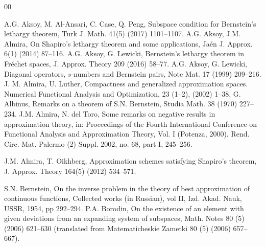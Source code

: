 \documentclass[12pt, reqno]{amsart}
\theoremstyle{definition}
\theoremstyle{remark}
\numberwithin{equation}{section}
\begin{document}
%
\begin{thebibliography}{00}

 A.G. Aksoy, M. Al-Ansari, C. Case, Q. Peng, Subspace condition for Bernstein's lethargy theorem, Turk J. Math. 41(5) (2017) 1101--1107.
 A.G. Aksoy,  J.M. Almira, On Shapiro's lethargy theorem and some applications, Ja\'{e}n J. Approx. 6(1) (2014) 87--116.
      A.G. Aksoy, G. Lewicki, Bernstein's lethargy theorem in Fr\'{e}chet spaces,  J. Approx. Theory 209 (2016) 58--77.
         A.G. Aksoy, G. Lewicki,  Diagonal operators, $s$-numbers and Bernstein pairs,  Note Mat. 17 (1999) 209--216.
         {J. M. Almira, U. Luther, } Compactness and generalized approximation spaces. Numerical Functional Analysis and Optimization, 23 (1--2), (2002) 1--38. 
 G. Albinus, Remarks on a theorem of S.N. Bernstein, Studia Math. 38 (1970) 227--234.
 J.M. Almira, N. del Toro, Some remarks on negative results in approximation theory, in:  Proceedings of the Fourth International Conference on Functional Analysis and Approximation Theory, Vol. I (Potenza, 2000). Rend. Circ. Mat. Palermo (2) Suppl. 2002, no. 68, part I, 245--256.

 J.M. Almira, T. Oikhberg, Approximation schemes satisfying Shapiro's theorem, J. Approx. Theory 164(5) (2012) 534--571.

 S.N. Bernstein, On the inverse problem in the theory of best approximation of continuous functions, Collected works (in Russian), vol II, Izd.  Akad. Nauk, USSR, 1954, pp 292--294.
 P.A. Borodin, On the existence of an element with given deviations from an expanding system of
subspaces, Math. Notes 80 (5) (2006) 621--630 (translated from Matematicheskie Zametki
80 (5) (2006) 657--667).


\end{thebibliography}
\end{document}
